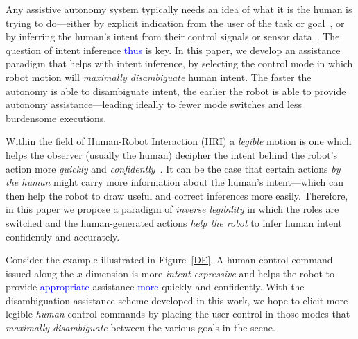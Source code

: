 \documentclass[conference]{IEEEtran}
\begin{document}
 Any assistive autonomy system typically needs an idea of what it is the human is trying to do---either by explicit indication from the user of the task or goal~\cite{choi2008laser}, or by inferring the human's intent from their control signals or sensor data~\cite{tavakkoli2007vision,wasson2003user}. The question of intent inference \textcolor{blue}{thus} is key. In this paper, we develop an assistance paradigm that helps with intent inference, by selecting the control mode in which robot motion will \textit{maximally disambiguate} human intent. The faster the autonomy is able to disambiguate intent, the earlier the robot is able to provide autonomy assistance---leading ideally to fewer mode switches and less burdensome executions. 


Within the field of Human-Robot Interaction (HRI) a \textit{legible} motion is one which helps the observer (usually the human) decipher the intent behind the robot's action more \textit{quickly} and \textit{confidently}~\cite{dragan2013legibility}. It can be the case that certain actions \textit{by the human} might carry more information about the human's intent---which can then help the robot to draw useful and correct inferences more easily. Therefore, in this paper we propose a paradigm of \textit{inverse legibility} in which the roles are switched and the human-generated actions \textit{help the robot} to infer human intent confidently and accurately. 

Consider the example illustrated in Figure~\ref{DE}. A human control command issued along the $x$ dimension is more \textit{intent expressive} and helps the robot to provide \textcolor{blue}{appropriate} assistance \textcolor{blue}{more} quickly and confidently. With the disambiguation assistance scheme developed in this work, we hope to elicit more legible \textit{human} control commands by placing the user control in those modes that \textit{maximally disambiguate} between the various goals in the scene. 
\end{document}
